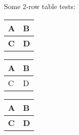 \documentclass{report}
\begin{document}
Some 2{-}row table tests:



\begin{tabular}{|l|l|}
\hline
\textbf{A} & \textbf{B} \\ \hline
\textbf{C} & \textbf{D} \\ \hline
\end{tabular}





\begin{tabular}{|l|l|}
\hline
A & B \\ \hline
C & D \\ \hline
\end{tabular}





\begin{tabular}{|l|l|}
\hline
A & B \\ \hline
\textbf{C} & \textbf{D} \\ \hline
\end{tabular}
\end{document}
